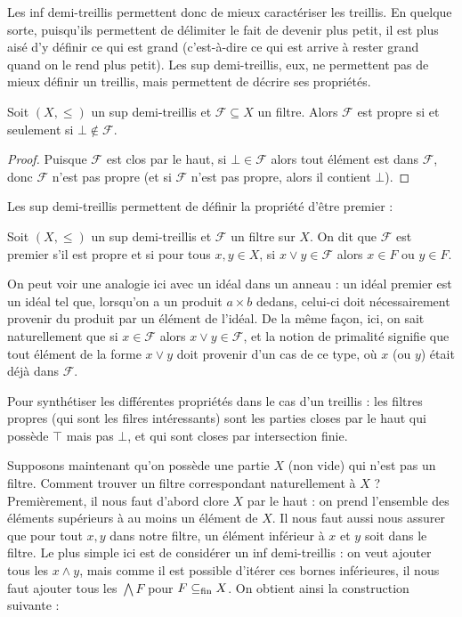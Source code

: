 Les inf demi-treillis permettent donc de mieux caractériser les treillis. En
quelque sorte, puisqu'ils permettent de délimiter le fait de devenir plus petit,
il est plus aisé d'y définir ce qui est grand (c'est-à-dire ce qui est arrive à
rester grand quand on le rend plus petit). Les sup demi-treillis, eux, ne
permettent pas de mieux définir un treillis, mais permettent de décrire ses
propriétés.

\begin{property}
  Soit $(X,\leq)$ un sup demi-treillis et $\mathcal F \subseteq X$ un filtre.
  Alors $\mathcal F$ est propre si et seulement si $\bot\notin\mathcal F$.
\end{property}

\begin{proof}
  Puisque $\mathcal F$ est clos par le haut, si $\bot\in\mathcal F$ alors tout
  élément est dans $\mathcal F$, donc $\mathcal F$ n'est pas propre (et si
  $\mathcal F$ n'est pas propre, alors il contient $\bot$).
\end{proof}

Les sup demi-treillis permettent de définir la propriété d'être premier :

\begin{definition}
  Soit $(X,\leq)$ un sup demi-treillis et $\mathcal F$ un filtre sur $X$. On dit
  que $\mathcal F$ est premier s'il est propre et si pour tous $x,y\in X$, si
  $x\lor y \in \mathcal F$ alors $x\in F$ ou $y\in F$.
\end{definition}

On peut voir une analogie ici avec un idéal dans un anneau : un idéal premier
est un idéal tel que, lorsqu'on a un produit $a\times b$ dedans, celui-ci doit
nécessairement provenir du produit par un élément de l'idéal. De la même façon,
ici, on sait naturellement que si $x\in\mathcal F$ alors
$x\lor y \in\mathcal F$, et la notion de primalité signifie que tout élément de
la forme $x\lor y$ doit provenir d'un cas de ce type, où $x$ (ou $y$) était déjà
dans $\mathcal F$.

Pour synthétiser les différentes propriétés dans le cas d'un treillis : les
filtres propres (qui sont les filres intéressants) sont les parties closes par
le haut qui possède $\top$ mais pas $\bot$, et qui sont closes par intersection
finie.

Supposons maintenant qu'on possède une partie $X$ (non vide) qui n'est pas un
filtre. Comment trouver un filtre correspondant naturellement à $X$ ?
Premièrement, il nous faut d'abord clore $X$ par le haut : on prend l'ensemble
des éléments supérieurs à au moins un élément de $X$. Il nous faut aussi nous
assurer que pour tout $x,y$ dans notre filtre, un élément inférieur à $x$ et $y$
soit dans le filtre. Le plus simple ici est de considérer un inf demi-treillis :
on veut ajouter tous les $x\land y$, mais comme il est possible d'itérer ces
bornes inférieures, il nous faut ajouter tous les $\bigwedge F$ pour
$F\subseteq_{\mathrm{fin}} X$. On obtient ainsi la construction suivante :

